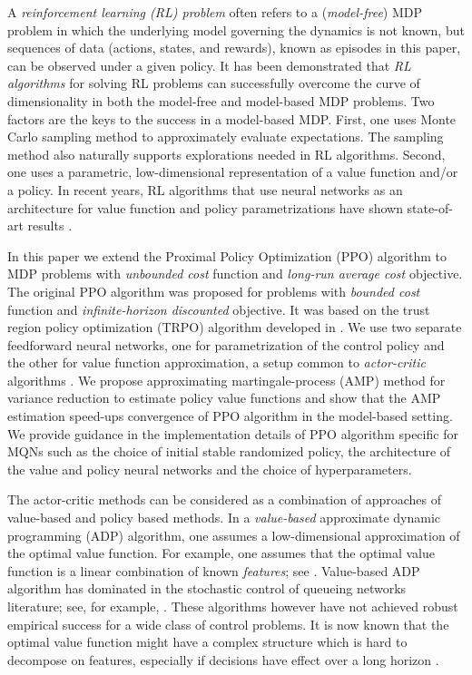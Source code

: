 \documentclass[11pt]{article}
\newcommand{\red}[1]{\textcolor{red}{#1}}
\theoremstyle{definition}
\numberwithin{equation}{section}
\begin{document}
A \emph{reinforcement learning (RL) problem} often refers to a
(\emph{model-free}) MDP problem in which the underlying model
governing the dynamics is not known, but sequences of data (actions,
states, and rewards), known as episodes in this paper, can be observed
under a given policy. It has been demonstrated that \emph{RL
  algorithms} for solving RL problems can successfully overcome the
curve of dimensionality in both the model-free and model-based MDP
problems. Two factors are the keys to the success in a model-based
MDP. First, one uses Monte Carlo sampling method to approximately evaluate
expectations. The sampling
method also naturally supports explorations needed in RL algorithms.
Second, one uses a parametric, low-dimensional representation of a
value function and/or a policy.  In recent years, RL algorithms that
use neural networks as an architecture for value function and policy
parametrizations have shown state-of-art results \cite{Bellemare2013, Mnih2015,
  Silver2017, OpenAI2019a}.

In this paper we extend the Proximal Policy Optimization (PPO)
algorithm to MDP problems with \emph{unbounded cost} function and
\emph{long-run average cost} objective. The original PPO algorithm
\cite{Schulman2017} was proposed for problems with \emph{bounded cost}
function and \emph{infinite-horizon discounted} objective. It was
based on the trust region policy optimization (TRPO) algorithm developed
in \cite{Schulman2015}. We use two separate feedforward neural
networks, one for parametrization of the control policy and the other
for value function approximation, a setup common to \emph{actor-critic}
algorithms \cite{Mnih2015}.  We propose approximating martingale-process
(AMP) method for variance reduction to estimate policy value functions
and show that the AMP estimation speed-ups convergence of PPO algorithm in the model-based
setting.  We provide guidance in the implementation details of PPO
algorithm specific for MQNs such as the choice of initial stable
randomized policy, the architecture of the value and policy neural
networks and the choice of hyperparameters.




The actor-critic methods can be considered as a combination of
approaches of value-based and policy based methods.  In a
\textit{value-based}  approximate dynamic programming (ADP) algorithm, one assumes a low-dimensional
approximation of the optimal value function.  For example, one assumes
that the optimal value function is a linear combination of known
\textit{features}; see \cite{DeFarias2003a, Ramirez-Hernandez2007,
  Abbasi_Yadkori2014a}.  Value-based ADP algorithm has dominated
in the stochastic control of queueing networks literature;
see, for example, \cite{ChenMeyn1999, MoalKumaVanR2008,
  Chenetal2009, Veatch2015}.  These algorithms however have not achieved
robust empirical success for a wide class of control problems. It is
now known that the optimal value function might have a complex
structure which is hard to decompose on features, especially if
decisions have effect over a long horizon \cite{Lehnert2018}.
\end{document}
